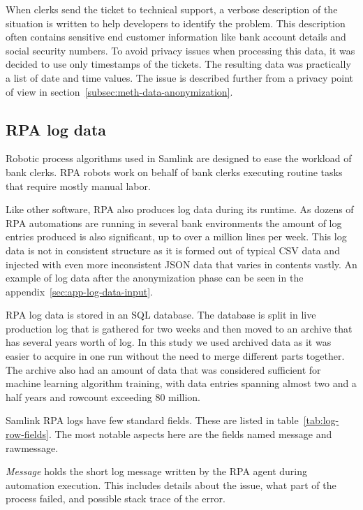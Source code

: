 When clerks send the ticket to technical support,
a verbose description of the situation is written
to help developers to identify the problem.
This description often contains sensitive end customer information
like bank account details and social security numbers.
To avoid privacy issues when processing this data,
it was decided to use only timestamps of the tickets.
The resulting data was practically a list of date and time values.
The issue is described further from a privacy point of view in section~\ref{subsec:meth-data-anonymization}.


\subsection{RPA log data}\label{subsec:meth-rpa-log-data}
Robotic process algorithms used in Samlink
are designed to ease the workload of bank clerks.
RPA robots work on behalf of bank clerks
executing routine tasks that require mostly manual labor.

Like other software,
RPA also produces log data during its runtime.
As dozens of RPA automations are running
in several bank environments
the amount of log entries produced is also significant,
up to over a million lines per week.
This log data is not in consistent structure
as it is formed out of typical CSV data
and injected with even more inconsistent JSON data
that varies in contents vastly.
An example of log data after the anonymization phase
can be seen in the appendix~\ref{sec:app-log-data-input}.

RPA log data is stored in an SQL database.
The database is split in live production log
that is gathered for two weeks
and then moved to an archive
that has several years worth of log.
In this study we used archived data
as it was easier to acquire in one run
without the need to merge different parts together.
The archive also had an amount of data
that was considered sufficient
for machine learning algorithm training,
with data entries spanning almost two and a half years
and rowcount exceeding 80 million.

Samlink RPA logs have few standard fields.
These are listed in table~\ref{tab:log-row-fields}.
The most notable aspects here
are the fields named message and rawmessage.

\textit{Message} holds the short log message
written by the RPA agent during automation execution.
This includes details about the issue,
what part of the process failed,
and possible stack trace of the error.

